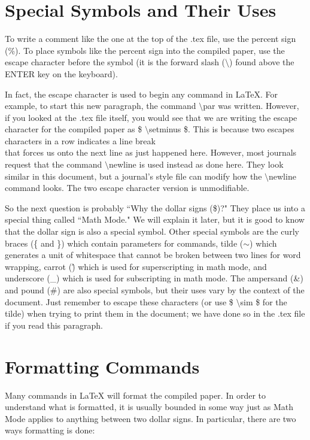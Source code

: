 \documentclass[10pt]{article}
\begin{document}
\section{Special Symbols and Their Uses\label{specialSymbols}}
To write a comment like the one at the top of the .tex file, use the percent sign (\%).  To place symbols like the percent sign into the compiled paper, use the escape character before the symbol (it is the forward slash ($ \setminus $) found above the ENTER key on the keyboard).
\par
In fact, the escape character is used to begin any command in LaTeX.  For example, to start this new paragraph, the command $ \setminus $par was written.  However, if you looked at the .tex file itself, you would see that we are writing the escape character for the compiled paper as \$ $ \setminus $setminus \$.  This is because two escapes characters in a row indicates a line break \\ that forces us onto the next line as just happened here.  However, most journals request that the command $ \setminus $newline is used instead as done \newline here.  They look similar in this document, but a journal's style file can modify how the $ \setminus $newline command looks.  The two escape character version is unmodifiable.
\par
So the next question is probably ``Why the dollar signs (\$)?"  They place us into a special thing called ``Math Mode."  We will explain it later, but it is good to know that the dollar sign is also a special symbol.  Other special symbols are the curly braces (\{ and \}) which contain parameters for commands, tilde ($ \sim $) which generates a unit of whitespace that cannot be broken between two lines for word wrapping, carrot (\^) which is used for superscripting in math mode, and underscore (\_) which is used for subscripting in math mode.  The ampersand (\&) and pound (\#) are also special symbols, but their uses vary by the context of the document.  Just remember to escape these characters (or use \$ $ \setminus $sim \$ for the tilde) when trying to print them in the document; we have done so in the .tex file if you read this paragraph.

\section{Formatting Commands\label{formattingCmds}}
Many commands in LaTeX will format the compiled paper.  In order to understand what is formatted, it is usually bounded in some way just as Math Mode applies to anything between two dollar signs.  In particular, there are two ways formatting is done:
\end{document}
